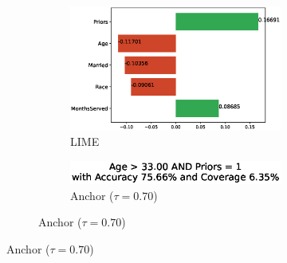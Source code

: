 \documentclass[runningheads]{llncs}
\begin{document}
  {%
    \def\scale{0.315}
    \def\dir{exp1/}
    \def\imgwidth{0.3\textwidth}
    \def\hspacebase{\hspace{-1.5em}}
    \def\vspacebase{\vspace{0.5em}}
    \def\vspacebeforecaption{\vspace{-0.4em}}
    \begin{figure}[t]
      \begin{subfigure}[t]{0.45\textwidth}
        \centering
        \begin{subfigure}[t]{\textwidth}
          \hspace{-10pt}
          \includegraphics[scale=\scale]{src/experiments/exp1/lime-0012}
          \caption{LIME}\label{fig:lime-0}
          \vspace{1.0em}
        \end{subfigure}

        \vspace{10pt}
        \begin{subfigure}[t]{\textwidth}
          \centering
          \includegraphics[scale=0.33]{src/experiments/exp1/anchor-0012-70}  %
          \caption{Anchor ($\tau=0.70$)}\label{fig:anchor-0-70}
          \vspace{1.0em}
        \end{subfigure}


\end{subfigure}
\end{figure}}
\end{document}
